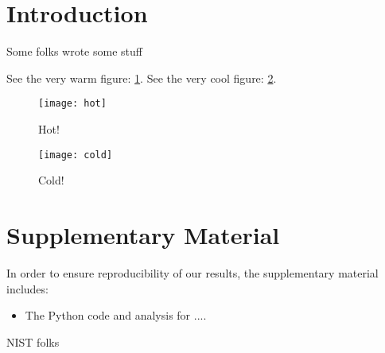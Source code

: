 
    
    \section{Introduction}

    Some folks wrote some stuff \cite{Span-BOOK-2000}

    See the very warm figure: \cref{fig:hot}.
    See the very cool figure: \cref{fig:cold}.

    \begin{figure}[H]
    \caption{Hot! \label{fig:hot}}
    \texttt{[image: hot]}
    \end{figure}

    \begin{figure}[H]
    \caption{Cold! \label{fig:cold}}
    \texttt{[image: cold]}
    \end{figure}
    

    \section{Supplementary Material}
    In order to ensure reproducibility of our results, the supplementary material includes:
    \begin{itemize}
    	\item The Python code and analysis for ....
    \end{itemize}

    \begin{acknowledgments}
    NIST folks
    \end{acknowledgments}
    
	
